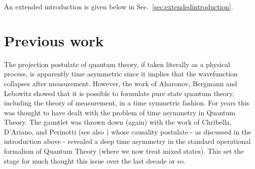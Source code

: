 \documentclass[10pt]{article}
\begin{document}
An extended introduction is given below in Sec.\ \ref{sec:extendedintroduction}.  


\begin{comment}
As a precursor, consider the following provocative statements:
\begin{enumerate}
\item We cannot signal from the future to the past.
\item Also, we cannot signal from the past to the future.
\item But we can steer information in either direction.
\end{enumerate}
The first statement is not provocative - it accords with our usual intuition.  The second statement is the time reverse of the first so it must be true in a time-symmetric formulation if the first statement is true.  It does not accord with our usual intuition, nor, indeed, our everyday experience.  The third statement uses the notion of steering \cite{steering} in the sense it is usually employed in entanglement theory.  The point is that we can communicate information from the future to the past only if we have information about the future available in the past.  And, similarly, we can communicate information from the past to the future only if we have information from the past available in the future.
\end{comment}

\section{Previous work}\label{sec:previouswork}

The projection postulate of quantum theory, if taken literally as a physical process, is apparently time asymmetric since it implies that the wavefunction collapses after measurement.  However, the work of Aharonov, Bergmann and Lebowitz \cite{aharonov1964time} showed that it is possible to formulate pure state quantum theory, including the theory of measurement, in a time symmetric fashion.  For years this was thought to have dealt with the problem of time asymmetry in Quantum Theory.  The gauntlet was thrown down (again) with the work of Chribella, D'Ariano, and Perinotti \cite{chiribella2010informational} (see also \cite{d2018causality}) whose causality postulate - as discussed in the introduction above - revealed a deep time asymmetry in the standard operational formalism of Quantum Theory (where we now treat mixed states).   This set the stage for much thought this issue over the last decade or so.
\end{document}

